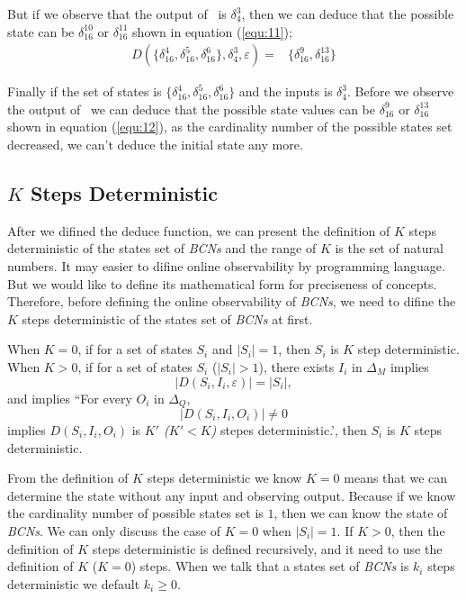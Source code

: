 But if we observe that the output of \BCN\ is $\delta_4^3$, then we can deduce that the possible state can be $\delta_{16}^{10}$ or  $\delta_{16}^{11}$ shown in equation (\ref{equ:11}); 
\begin{equation}
\begin{split}
D\left(\{\delta_{16}^4,\delta_{16}^5,\delta_{16}^6\},\delta_4^3,\varepsilon\right)=&\{\delta_{16}^9,\delta_{16}^{13}\}
\end{split}
\label{equ:12}
\end{equation}

 Finally if the set of states is $\{\delta_{16}^4,\delta_{16}^5,\delta_{16}^6\}$ and the inputs is $\delta_4^3$. Before we observe the output of \BCN\ we can deduce that the possible state values can be $\delta_{16}^9$ or  $\delta_{16}^{13}$ shown in equation (\ref{equ:12}), as  the cardinality number of the possible states set decreased, we can't deduce the initial state any more. 

\subsection{$K$ Steps Deterministic}
After we difined the deduce function, we can present the definition of $K$ steps deterministic of the states set of {\em BCNs} and the range of $K$ is the set of natural numbers. It may easier to difine online observability by programming language. But we would like to define its mathematical form for preciseness of concepts. Therefore, before defining the online observability of {\em BCNs}, we need to difine the $K$ steps deterministic of the states set of {\em BCNs} at first.
\begin{definition} 
When $K=0$, 
 if for a set of states $S_i$ and $|S_i|=1$, then $S_i$ is $K$ step deterministic. When $K>0$, 
 if for a set of states $S_i$ ($|S_i|>1$), there exists $I_i$ in $\Delta_M$ implies \[|D\left(S_i,I_i,\varepsilon\right)|=|S_i|, \]and implies ``For every $O_i$ in $\Delta_Q$, \[|D\left(S_i,I_i,O_i\right)|\neq 0\] implies $D\left(S_i,I_i,O_i\right)$ is {\em$K'$ (${K'}<K$)} stepes deterministic.', then $S_i$ is $K$ steps deterministic.
\end{definition}

From the definition of {\em$K$} steps deterministic we know $K=0$ means that we can determine the state without any input and observing output. Because if we know the cardinality number of possible states set is $1$, then we can know the state of {\em BCNs}. We can only discuss the case of $K=0$ when $|S_i|=1$. If $K>0$, then the definition of $K$ steps deterministic is defined recursively, and it need to use the definition of $K$ ($K=0$) steps. When we talk that a states set of {\em BCNs} is $k_i$ steps deterministic we default $k_i\ge0$.

